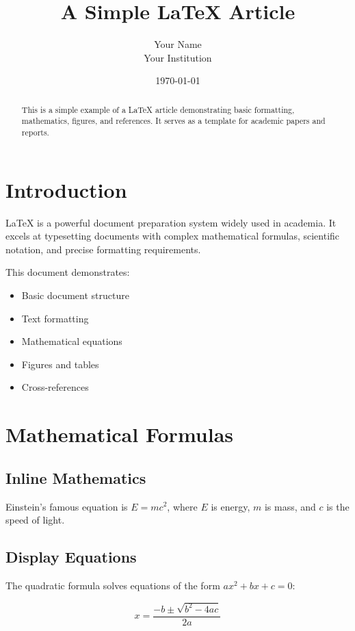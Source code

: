 \documentclass[11pt,a4paper]{article}
\title{A Simple LaTeX Article}
\author{Your Name \\ Your Institution}
\date{\today}
\begin{document}
\maketitle

\begin{abstract}
This is a simple example of a LaTeX article demonstrating basic formatting, mathematics, figures, and references. It serves as a template for academic papers and reports.
\end{abstract}

\tableofcontents

\section{Introduction}

LaTeX is a powerful document preparation system widely used in academia. It excels at typesetting documents with complex mathematical formulas, scientific notation, and precise formatting requirements.

This document demonstrates:
\begin{itemize}
    \item Basic document structure
    \item Text formatting
    \item Mathematical equations
    \item Figures and tables
    \item Cross-references
\end{itemize}

\section{Mathematical Formulas}

\subsection{Inline Mathematics}

Einstein's famous equation is $E = mc^2$, where $E$ is energy, $m$ is mass, and $c$ is the speed of light.

\subsection{Display Equations}

The quadratic formula solves equations of the form $ax^2 + bx + c = 0$:

\begin{equation}
    x = \frac{-b \pm \sqrt{b^2 - 4ac}}{2a}
    \label{eq:quadratic}
\end{equation}
\end{document}
